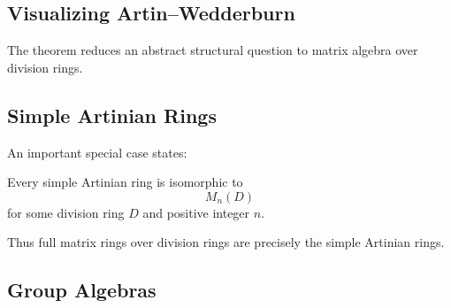 \subsection{Visualizing Artin--Wedderburn}
\label{subsec:artin-wedderburn-visual}

\begin{center}
\end{center}

The theorem reduces an abstract structural question to matrix algebra over
division rings.

\subsection{Simple Artinian Rings}
\label{subsec:simple-artinian-rings}

An important special case states:

\begin{theorem}
Every simple Artinian ring is isomorphic to
\[ M_n(D) \]
for some division ring \(D\) and positive integer \(n\).
\end{theorem}

Thus full matrix rings over division rings are precisely the simple
Artinian rings.

\subsection{Group Algebras}
\label{subsec:group-algebras}

